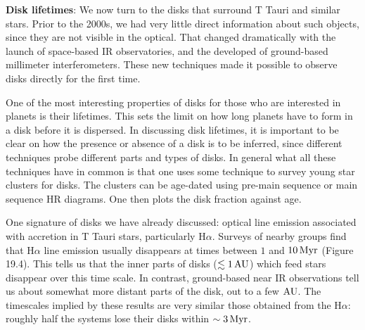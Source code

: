 \documentclass[a4paper,10pt]{article}
\begin{document}
{\noindent}\textbf{Disk lifetimes}: We now turn to the disks that surround T Tauri and similar stars. Prior to the 2000s, we had very little direct information about such objects, since they are not visible in the optical. That changed dramatically with the launch of space-based IR observatories, and the developed of ground-based millimeter interferometers. These new techniques made it possible to observe disks directly for the first time.

{\noindent}One of the most interesting properties of disks for those who are interested in planets is their lifetimes. This sets the limit on how long planets have to form in a disk before it is dispersed. In discussing disk lifetimes, it is important to be clear on how the presence or absence of a disk is to be inferred, since different techniques probe different parts and types of disks. In general what all these techniques have in common is that one uses some technique to survey young star clusters for disks. The clusters can be age-dated using pre-main sequence or main sequence HR diagrams. One then plots the disk fraction against age.

{\noindent}One signature of disks we have already discussed: optical line emission associated with accretion in T Tauri stars, particularly H$\alpha$. Surveys of nearby groups find that H$\alpha$ line emission usually disappears at times between $1$ and $10\,{\rm Myr}$ (Figure 19.4). This tells us that the inner parts of disks ($\lesssim1\,{\rm AU}$) which feed stars disappear over this time scale. In contrast, ground-based near IR observations tell us about somewhat more distant parts of the disk, out to a few ${\rm AU}$. The timescales implied by these results are very similar those obtained from the H$\alpha$: roughly half the systems lose their disks within $\sim3\,{\rm Myr}$.
\end{document}
